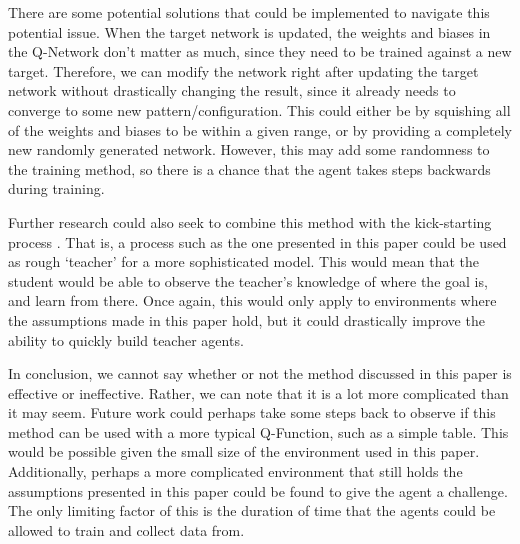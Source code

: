 \documentclass[12pt,letterpaper]{article}
\begin{document}
There are some potential solutions that could be implemented to navigate this potential issue.
When the target network is updated, the weights and biases in the Q-Network don't matter as much, since they need to be trained against a new target.
Therefore, we can modify the network right after updating the target network without drastically changing the result, since it already needs to converge to some new pattern/configuration.
This could either be by squishing all of the weights and biases to be within a given range, or by providing a completely new randomly generated network.
However, this may add some randomness to the training method, so there is a chance that the agent takes steps backwards during training.

Further research could also seek to combine this method with the kick-starting process \cite{article_kickstart_deep_reinforcement_learning}.
That is, a process such as the one presented in this paper could be used as rough `teacher' for a more sophisticated model.
This would mean that the student would be able to observe the teacher's knowledge of where the goal is, and learn from there.
Once again, this would only apply to environments where the assumptions made in this paper hold, but it could drastically improve the ability to quickly build teacher agents.

In conclusion, we cannot say whether or not the method discussed in this paper is effective or ineffective.
Rather, we can note that it is a lot more complicated than it may seem.
Future work could perhaps take some steps back to observe if this method can be used with a more typical Q-Function, such as a simple table.
This would be possible given the small size of the environment used in this paper.
Additionally, perhaps a more complicated environment that still holds the assumptions presented in this paper could be found to give the agent a challenge.
The only limiting factor of this is the duration of time that the agents could be allowed to train and collect data from.

\newpage


\end{document}
